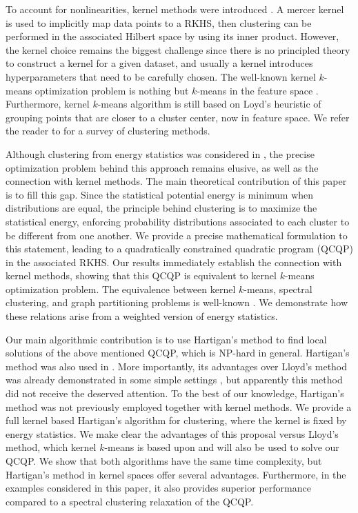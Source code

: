 \documentclass[aps,preprint,nofootinbib,floatfix]{revtex4-1}
\begin{document}
To account for nonlinearities, kernel methods were introduced 
\cite{Smola,Girolami}. A mercer kernel \cite{Mercer} is used to implicitly
map data points to a RKHS, then clustering can be performed in the associated
Hilbert space by using its inner product. However, the kernel choice remains 
the biggest challenge since there is no principled theory to construct a kernel
for a given dataset, and usually a kernel introduces hyperparameters that 
need to be carefully chosen.
The well-known kernel $k$-means optimization problem is nothing but $k$-means 
in the feature space \cite{Girolami}. Furthermore, kernel $k$-means algorithm
\cite{Dhillon2,Dhillon} is still based on Loyd's heuristic \cite{Lloyd}
of grouping points that are closer to a cluster center, now
in feature space. 
We refer the reader to \cite{Filippone} for a survey of clustering
methods.

Although clustering from energy statistics was considered
in \cite{Kgroups}, the precise optimization problem behind this approach
remains elusive, as well as the connection with kernel methods.
The main theoretical contribution of this paper is to fill this gap.
Since the statistical potential energy is minimum when
distributions are equal, the principle behind clustering is to maximize 
the statistical energy,  enforcing probability distributions associated to 
each cluster to be different from one another. We provide a precise 
mathematical formulation to this statement, leading to a quadratically 
constrained quadratic program (QCQP) in the associated RKHS. Our results
immediately establish the connection with kernel methods, showing that this 
QCQP is equivalent to kernel $k$-means optimization problem. The 
equivalence between kernel $k$-means, spectral clustering, and graph 
partitioning problems is well-known \cite{Dhillon,Dhillon2}. We demonstrate 
how these relations arise from a weighted version of energy statistics.

Our main 
algorithmic contribution is to use Hartigan's method \cite{Hartigan} to 
find local solutions of the above mentioned QCQP, which is NP-hard in general.
Hartigan's method was also used in \cite{Kgroups}. More importantly, its 
advantages
over Lloyd's method was already demonstrated 
in some simple settings
\cite{Telgarsky,Slonin}, but apparently this method did not receive 
the deserved attention. To the 
best of our knowledge, Hartigan's method was not previously 
employed together with kernel methods. 
We provide a full kernel based Hartigan's algorithm for clustering,
where the kernel is fixed by energy statistics. 
We make clear the advantages of this proposal versus 
Lloyd's method, which kernel $k$-means is based upon and will also be used 
to solve our QCQP. We show that both algorithms  have the same
time complexity, but Hartigan's method in kernel spaces offer several
advantages. Furthermore, in the examples considered in this paper, it 
also provides superior performance compared to a spectral clustering
relaxation of the QCQP.
\end{document}
